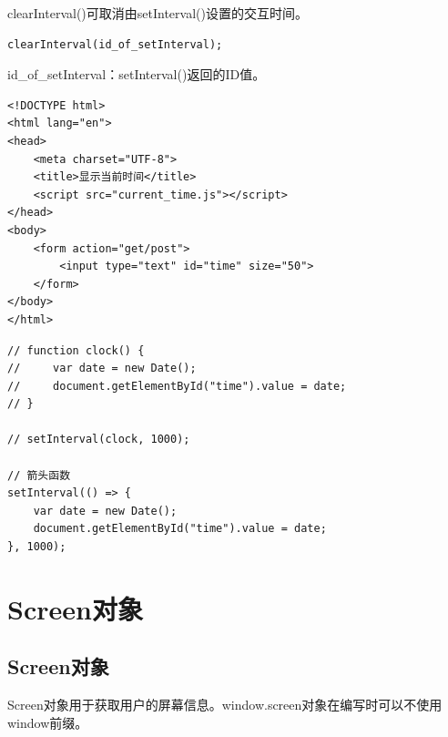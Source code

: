 clearInterval()可取消由setInterval()设置的交互时间。 \\

\begin{lstlisting}[style=htmlcssjs]
clearInterval(id_of_setInterval);
\end{lstlisting}

id\_of\_setInterval：setInterval()返回的ID值。 \\


\begin{lstlisting}[style=htmlcssjs, title=current\_time.html]
<!DOCTYPE html>
<html lang="en">
<head>
    <meta charset="UTF-8">
    <title>显示当前时间</title>
    <script src="current_time.js"></script>
</head>
<body>
    <form action="get/post">
        <input type="text" id="time" size="50">
    </form>
</body>
</html>
\end{lstlisting}

\begin{lstlisting}[style=htmlcssjs, title=current\_time.js]
// function clock() {
//     var date = new Date();
//     document.getElementById("time").value = date;
// }

// setInterval(clock, 1000);

// 箭头函数
setInterval(() => {
    var date = new Date();
    document.getElementById("time").value = date;
}, 1000);
\end{lstlisting}

\newpage

\section{Screen对象}

\subsection{Screen对象}

Screen对象用于获取用户的屏幕信息。window.screen对象在编写时可以不使用window前缀。

\begin{table}[H]
	\centering
	\caption{Screen属性}
\end{table}

